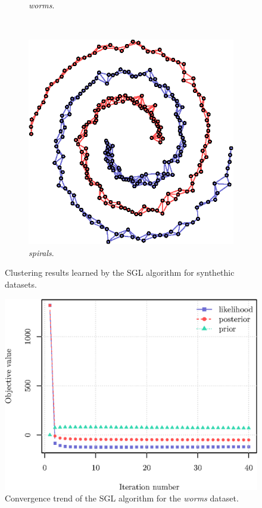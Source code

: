 \begin{figure}[!htb]
\begin{subfigure}[b]{0.23\textwidth}
      \caption{\textit{worms}.}
    \end{subfigure} \\
    \begin{subfigure}[b]{0.23\textwidth}
      \includegraphics[width=\textwidth]{clusters/latex/figures/spirals.eps}
      \caption{\textit{spirals}.}
    \end{subfigure}
    \caption{Clustering results learned by the \textsf{SGL} algorithm for synthethic datasets.}
    \label{fig:clusters}
\end{figure}

\begin{figure}[!htb]
  \centering
  \includegraphics[width=.5\textwidth]{clusters/latex/figures/worms_trend.eps}
  \caption{Convergence trend of the \textsf{SGL} algorithm for the \textit{worms} dataset.}
  \label{fig:worms_trend}
\end{figure}
